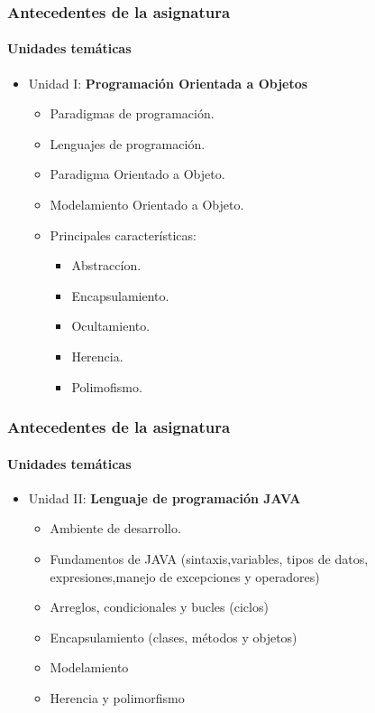 \documentclass{beamer}
\begin{document}
		\begin{frame}
			\frametitle{Antecedentes de la asignatura}
			\framesubtitle{Unidades tem\'aticas}

			\begin{itemize}
				\item Unidad I: \textbf{Programaci\'on Orientada a Objetos}
				\begin{itemize}
					\item Paradigmas de programaci\'on.
					\item Lenguajes de programaci\'on.
					\item Paradigma Orientado a Objeto.
					\item Modelamiento Orientado a Objeto.
					\item Principales caracter\'isticas:
\begin{itemize}
						\item {Abstracc\'ion}.
						\item {Encapsulamiento}.
						\item {Ocultamiento}.
						\item{ Herencia}.
						\item {Polimofismo}.
\end{itemize}
				\end{itemize}
			\end{itemize}
		\end{frame}

		\begin{frame}
			\frametitle{Antecedentes de la asignatura}
			\framesubtitle{Unidades tem\'aticas}

			\begin{itemize}
				\item Unidad II: \textbf{Lenguaje de programaci\'on JAVA}
				\begin{itemize}
					\item Ambiente  de desarrollo.
					\item Fundamentos de JAVA (sintaxis,variables, tipos de datos, expresiones,manejo de excepciones y operadores)
					\item Arreglos, condicionales y bucles (ciclos)
					\item Encapsulamiento (clases, m\'etodos y objetos)
					\item Modelamiento
					\item Herencia y polimorfismo
				\end{itemize}
			\end{itemize}
		\end{frame}
\end{document}

